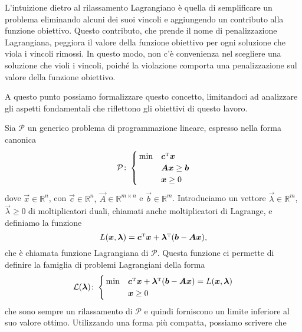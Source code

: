 L'intuizione dietro al rilassamento Lagrangiano è quella di semplificare un
problema eliminando alcuni dei suoi vincoli e aggiungendo un contributo
alla funzione obiettivo. Questo contributo, che prende il nome di
penalizzazione Lagrangiana, peggiora il valore della funzione obiettivo per
ogni soluzione che viola i vincoli rimossi. In questo modo, non c'è
convenienza nel scegliere una soluzione che violi i vincoli, poiché la
violazione comporta una penalizzazione sul valore della funzione obiettivo.

A questo punto possiamo formalizzare questo concetto, limitandoci ad
analizzare gli aspetti fondamentali che riflettono gli obiettivi di questo
lavoro.

Sia $\mathcal{P}$ un generico problema di programmazione lineare, espresso
nella forma canonica
\begin{equation}
    \mathcal{P}\colon
    \begin{cases}
        \,\min & \bm{c}^{\scriptscriptstyle\mathrm{T}} \bm{x} \\
               & \bm{A} \bm{x} \ge \bm{b} \\
             & \bm{x} \ge 0
    \end{cases}
\end{equation}
dove $\vec{x} \in \mathbb{R}^n$, con $\vec{c} \in \mathbb{R}^n,\ \vec{A}
\in \mathbb{R}^{m \times n}$ e $\vec{b} \in \mathbb{R}^m$. Introduciamo un
vettore $\vec{\lambda} \in \mathbb{R}^m$, $\vec{\lambda} \ge 0$ di
moltiplicatori duali, chiamati anche moltiplicatori di Lagrange, e definiamo
la funzione
\begin{equation}
    L(\bm{x}, \bm{\lambda}) = \bm{c}^{\scriptscriptstyle\mathrm{T}} \bm{x}
    + \bm{\lambda}^{\scriptscriptstyle\mathrm{T}} (\bm{b} - \bm{A} \bm{x}),
\end{equation}
che è chiamata funzione Lagrangiana di $\mathcal{P}$. Questa funzione ci
permette di definire la famiglia di problemi Lagrangiani della forma
\begin{equation}
    \mathcal{L}(\bm{\lambda})\colon
    \begin{cases}
        \,\min &
    \bm{c}^{\scriptscriptstyle\mathrm{T}} \bm{x} + \bm{\lambda}^{\scriptscriptstyle\mathrm{T}} (\bm{b} - \bm{A}
    \bm{x}) = L(\bm{x}, \bm{\lambda}) \\
             & \bm{x} \ge 0 \\
    \end{cases}
\end{equation}
che sono sempre un rilassamento di $\mathcal{P}$ e quindi forniscono un
limite inferiore al suo valore ottimo. Utilizzando una forma più compatta,
possiamo scrivere che
